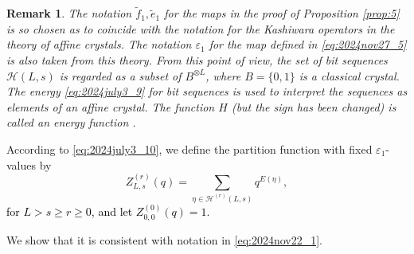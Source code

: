 \documentclass[sn-mathphys-num]{sn-jnl}%
\newcommand{\red}[1]{\textcolor{black}{#1}}
\theoremstyle{thmstyleone}%
\theoremstyle{thmstyletwo}%
\newtheorem{remark}{Remark}%
\theoremstyle{thmstylethree}%
\begin{document}
\begin{remark}
The notation $\tilde{f}_1, \tilde{e}_1$ for the maps in the proof of Proposition \ref{prop:5}
is so chosen as to coincide with the notation for the Kashiwara operators in the theory of
affine crystals. 
The notation $\varepsilon_1$ for the map defined in \eqref{eq:2024nov27_5} is also taken from
this theory.
From this point of view, the set of bit sequences $\mathcal{H} (L,s)$ is
regarded as a subset of $B^{\otimes L}$, where $B = \{ 0,1 \}$ is a classical crystal.
The energy \eqref{eq:2024july3_9} for bit sequences is used to interpret
the sequences as elements of an affine crystal. 
The function $H$ (but the sign has been changed) is called an energy function \cite{KMN}.
\end{remark}



According to \eqref{eq:2024july3_10}, we define the partition function with
fixed $\varepsilon_1$-values by
\begin{equation}\label{eq:2024oct18_1}
Z_{L,s}^{(r)}(q)=
\sum_{\eta \in \mathcal{H}^{(r)} (L,s)} q^{E(\eta)},
\end{equation}
\red{for $L >s \geq r \geq 0$, and let $Z_{0,0}^{(0)}(q) =1$.}

We show that it
is consistent with notation in \eqref{eq:2024nov22_1}.
\end{document}

